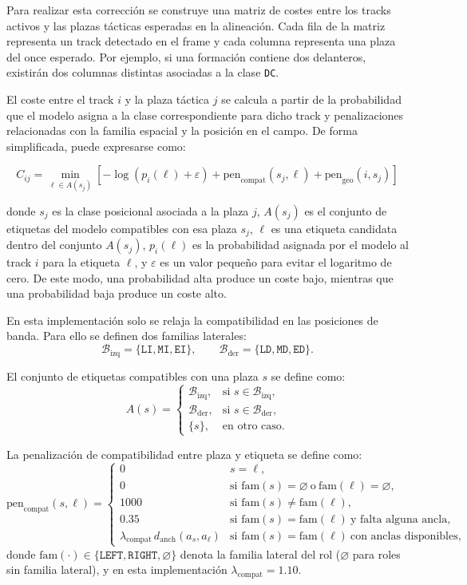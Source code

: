 Para realizar esta corrección se construye una matriz de costes entre los tracks activos y las plazas tácticas esperadas en la alineación. Cada fila de la matriz representa un track detectado en el frame y cada columna representa una plaza del once esperado. Por ejemplo, si una formación contiene dos delanteros, existirán dos columnas distintas asociadas a la clase \texttt{DC}.

El coste entre el track \(i\) y la plaza táctica \(j\) se calcula a partir de la probabilidad que el modelo asigna a la clase correspondiente para dicho track y penalizaciones relacionadas con la familia espacial y la posición en el campo. De forma simplificada, puede expresarse como:

\[
C_{ij}=\min_{\ell\in A(s_j)}
\left[
-\log\left(p_i(\ell)+\varepsilon\right)
+\mathrm{pen}_{\mathrm{compat}}(s_j,\ell)
+\mathrm{pen}_{\mathrm{geo}}(i,s_j)
\right]
\]


donde \(s_j\) es la clase posicional asociada a la plaza \(j\), \(A(s_j)\) es el conjunto de etiquetas del modelo compatibles con esa plaza \(s_j\), \(\ell\) es una etiqueta candidata dentro del conjunto \(A(s_j)\), \(p_i(\ell)\) es la probabilidad asignada por el modelo al track \(i\) para la etiqueta \(\ell\), y \(\varepsilon\) es un valor pequeño para evitar el logaritmo de cero. De este modo, una probabilidad alta produce un coste bajo, mientras que una probabilidad baja produce un coste alto.

En esta implementación solo se relaja la compatibilidad en las posiciones de banda. 
Para ello se definen dos familias laterales:
\[
\mathcal{B}_{\mathrm{izq}}=\{\texttt{LI},\texttt{MI},\texttt{EI}\},
\qquad
\mathcal{B}_{\mathrm{der}}=\{\texttt{LD},\texttt{MD},\texttt{ED}\}.
\]

El conjunto de etiquetas compatibles con una plaza \(s\) se define como:
\[
A(s)=
\begin{cases}
\mathcal{B}_{\mathrm{izq}}, & \text{si } s\in \mathcal{B}_{\mathrm{izq}},\\[0.3em]
\mathcal{B}_{\mathrm{der}}, & \text{si } s\in \mathcal{B}_{\mathrm{der}},\\[0.3em]
\{s\}, & \text{en otro caso}.
\end{cases}
\]

La penalización de compatibilidad entre plaza y etiqueta se define como:
\[
\mathrm{pen}_{\mathrm{compat}}(s,\ell)=
\begin{cases}
0 & s=\ell,\\
0 & \text{si } \mathrm{fam}(s)=\varnothing \ \text{o}\ \mathrm{fam}(\ell)=\varnothing,\\
1000 & \text{si } \mathrm{fam}(s)\neq \mathrm{fam}(\ell),\\
0.35 & \text{si } \mathrm{fam}(s)=\mathrm{fam}(\ell)\ \text{y falta alguna ancla},\\
\lambda_{\mathrm{compat}}\, d_{\mathrm{anch}}(a_s,a_\ell) & \text{si } \mathrm{fam}(s)=\mathrm{fam}(\ell)\ \text{con anclas disponibles},
\end{cases}
\]
donde \(\mathrm{fam}(\cdot)\in\{\texttt{LEFT},\texttt{RIGHT},\varnothing\}\) denota la familia lateral del rol
(\(\varnothing\) para roles sin familia lateral), y en esta implementación \(\lambda_{\mathrm{compat}}=1.10\).

